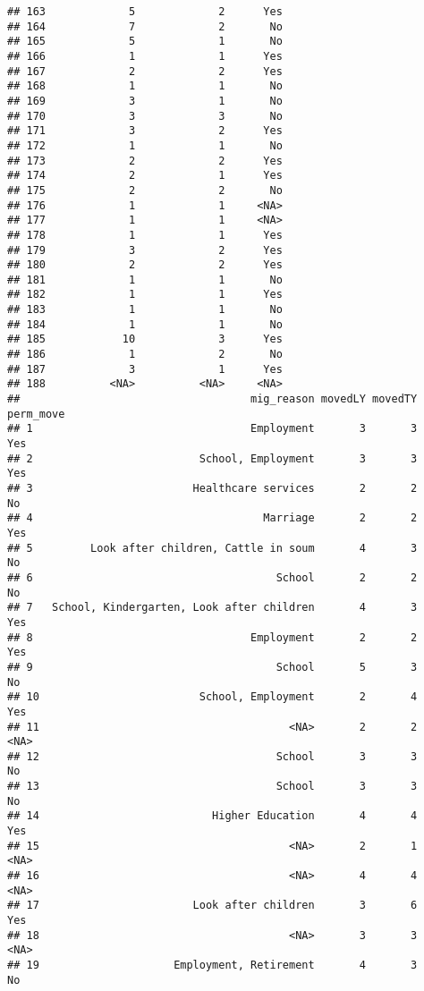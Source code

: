 \documentclass[
]{article}
\begin{document}
\begin{verbatim}
## 163             5             2      Yes
## 164             7             2       No
## 165             5             1       No
## 166             1             1      Yes
## 167             2             2      Yes
## 168             1             1       No
## 169             3             1       No
## 170             3             3       No
## 171             3             2      Yes
## 172             1             1       No
## 173             2             2      Yes
## 174             2             1      Yes
## 175             2             2       No
## 176             1             1     <NA>
## 177             1             1     <NA>
## 178             1             1      Yes
## 179             3             2      Yes
## 180             2             2      Yes
## 181             1             1       No
## 182             1             1      Yes
## 183             1             1       No
## 184             1             1       No
## 185            10             3      Yes
## 186             1             2       No
## 187             3             1      Yes
## 188          <NA>          <NA>     <NA>
##                                    mig_reason movedLY movedTY  perm_move
## 1                                  Employment       3       3        Yes
## 2                          School, Employment       3       3        Yes
## 3                         Healthcare services       2       2         No
## 4                                    Marriage       2       2        Yes
## 5         Look after children, Cattle in soum       4       3         No
## 6                                      School       2       2         No
## 7   School, Kindergarten, Look after children       4       3        Yes
## 8                                  Employment       2       2        Yes
## 9                                      School       5       3         No
## 10                         School, Employment       2       4        Yes
## 11                                       <NA>       2       2       <NA>
## 12                                     School       3       3         No
## 13                                     School       3       3         No
## 14                           Higher Education       4       4        Yes
## 15                                       <NA>       2       1       <NA>
## 16                                       <NA>       4       4       <NA>
## 17                        Look after children       3       6        Yes
## 18                                       <NA>       3       3       <NA>
## 19                     Employment, Retirement       4       3         No

\end{verbatim}
\end{document}
